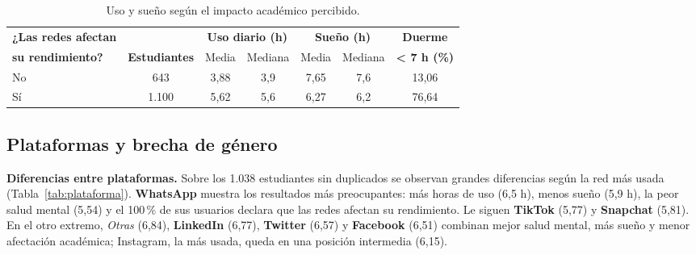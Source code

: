\begin{table}[H]
\centering
\small
\caption{Uso y sueño según el impacto académico percibido.}
\label{tab:academico}
\begin{tabular}{l c cc cc c}
\toprule
\textbf{¿Las redes afectan} & & \multicolumn{2}{c}{\textbf{Uso diario (h)}} & \multicolumn{2}{c}{\textbf{Sueño (h)}} & \textbf{Duerme} \\
\cmidrule(lr){3-4}\cmidrule(lr){5-6}
\textbf{su rendimiento?} & \textbf{Estudiantes} & Media & Mediana & Media & Mediana & \textbf{< 7 h (\%)} \\
\midrule
No & 643   & 3,88 & 3,9 & 7,65 & 7,6 & 13,06 \\
Sí & 1.100 & 5,62 & 5,6 & 6,27 & 6,2 & 76,64 \\
\bottomrule
\end{tabular}
\end{table}

\subsection{Plataformas y brecha de género}

\textbf{Diferencias entre plataformas.} Sobre los 1.038 estudiantes sin duplicados se observan grandes
diferencias según la red más usada (Tabla~\ref{tab:plataforma}). \textbf{WhatsApp} muestra los resultados
más preocupantes: más horas de uso (6,5 h), menos sueño (5,9 h), la peor salud mental (5,54) y el
100\,\% de sus usuarios declara que las redes afectan su rendimiento. Le siguen \textbf{TikTok} (5,77) y
\textbf{Snapchat} (5,81). En el otro extremo, \emph{Otras} (6,84), \textbf{LinkedIn} (6,77),
\textbf{Twitter} (6,57) y \textbf{Facebook} (6,51) combinan mejor salud mental, más sueño y menor
afectación académica; Instagram, la más usada, queda en una posición intermedia (6,15).

